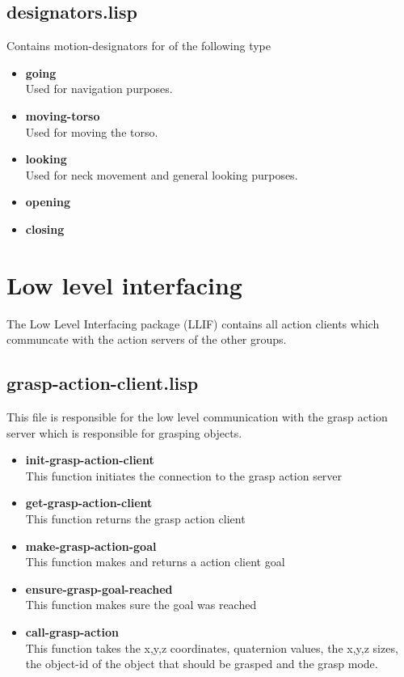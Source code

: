\documentclass[main.tex]{subfiles}
\begin{document}
	    \subsection{designators.lisp}
	    Contains motion-designators for of the following type
	    \begin{itemize}
	    	\item \textbf{going} \\
		Used for navigation purposes.
		\item \textbf{moving-torso} \\
		Used for moving the torso.
		\item \textbf{looking} \\
		Used for neck movement and general looking purposes.
		\item \textbf{opening} \\
		
		\item \textbf{closing} \\
	    \end{itemize}

	  	\section{Low level interfacing}
	  	\label{llif}
		The Low Level Interfacing package (LLIF) contains all action clients which communcate with the action servers of the other groups.
		\subsection{grasp-action-client.lisp}
		This file is responsible for the low level communication with the
		grasp action server which is responsible for grasping objects.
		\begin{itemize}
			\item \textbf{init-grasp-action-client} \\
			This function initiates the connection to the grasp action server
			\item \textbf{get-grasp-action-client} \\
			This function returns the grasp action client
			\item \textbf{make-grasp-action-goal} \\
			This function makes and returns a action client goal
			\item \textbf{ensure-grasp-goal-reached} \\
            This function makes sure the goal was reached
			\item \textbf{call-grasp-action} \\
			This function takes the x,y,z coordinates, quaternion values, the x,y,z sizes, the object-id of the object that should be grasped and the grasp mode.
		\end{itemize}
\end{document}
